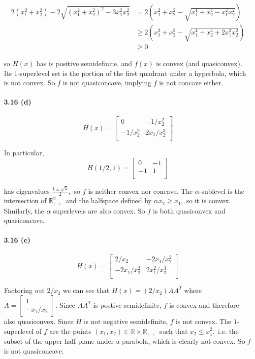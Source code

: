 \documentclass[a4paper,12pt]{article}
\begin{document}
\begin{align*}
 2(x_1^2 + x_2^2) - 2\sqrt{(x_1^2+x_2^2)^2 - 3 x_1^2 x_2^2} &= 2 \left( x_1^2 + x_2^2 - \sqrt{ x_1^4 + x_2^4 - x_1^2x_2^2 }\right) \\
 &\geq 2 \left( x_1^2 + x_2^2 - \sqrt{ x_1^4 + x_2^4 +2 x_1^2x_2^2 }\right) \\
 &\geq 0
\end{align*}

so $H(x)$ has is positive semidefinite, and $f(x)$ is convex (and quasiconvex). Its $1$-superlevel set is the portion of the first quadrant under a hyperbola, which is not convex. So $f$ is not quasiconcave, implying $f$ is not concave either. 


\paragraph*{3.16 (d) }
$$
H(x) = 
\begin{bmatrix}
    0       & -1/x_2^2 \\
    -1/x_2^2       & 2x_1/x_2^3 \\
\end{bmatrix}
$$

In particular, 
$$
H(1/2, 1) = 
\begin{bmatrix}
    0       & -1 \\
    -1       & 1 \\
\end{bmatrix}
$$

has eigenvalues $\frac{1 \pm \sqrt{5}}{2},$ so $f$ is neither convex nor concave. The $\alpha$-sublevel is the intersection of $\mathbb{R}^2_{++}$ and the halfspace defined by $\alpha x_2 \geq x_1,$ so it is convex. Similarly, the $\alpha$ superlevels are also convex. So $f$ is both quasiconvex and quasiconcave. 



\paragraph*{3.16 (e) }
$$
H(x) = 
\begin{bmatrix}
    2/x_2       & -2x_1/x_2^2 \\
    -2x_1/x_2^2       & 2x_1^2/x_2^3 \\
\end{bmatrix}
$$

Factoring out $2/x_2$ we can see that $H(x) = (2/x_2) AA^T$ where $A = \begin{bmatrix}1 \\-x_1/x_2\end{bmatrix}.$ Since $AA^T$ is postive semidefinite, $f$ is convex and therefore also quasiconvex. Since $H$ is not negative semidefinite, $f$ is not convex. The $1$-superlevel of $f$ are the points $(x_1,x_2) \in \mathbb{R} \times \mathbb{R}_{++}$ such that $x_2 \leq x_1^2,$ i.e. the subset of the upper half plane under a parabola, which is clearly not convex. So $f$ is not quasiconcave. 
\end{document}
